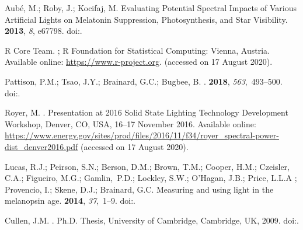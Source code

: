 \documentclass[energies,article,accept,moreauthors,pdftex]{Definitions/mdpi}\usepackage[]{graphicx}\usepackage[]{color}
\begin{document}
\begin{thebibliography}{999}
Aub{\'e}, M.; Roby, J.; Kocifaj, M.
\newblock Evaluating Potential Spectral Impacts of Various Artificial Lights on
  Melatonin Suppression, Photosynthesis, and Star Visibility.
 {\bf 2013}, {\em 8}, e67798.
\newblock
  doi:{\href{https://doi.org/10.1371/journal.pone.0067798}{}}.%









{R Core Team}.
;
\newblock R Foundation for Statistical Computing: Vienna, Austria.  Available online: 
  \url{https://www.r-project.org}.
\newblock (accessed on 17 August 2020).%

Pattison, P.M.; Tsao, J.Y.; Brainard, G.C.; Bugbee, B.
.
 {\bf 2018}, {\em 563},~493--500.
\newblock
  doi:{\href{https://doi.org/10.1038/s41586-018-0706-x}{}}.%

Royer, M.
.
\newblock Presentation at 2016 Solid State Lighting Technology Development
  Workshop,  Denver, CO, USA, 16--17 November 2016.  Available online:  
  \url{https://www.energy.gov/sites/prod/files/2016/11/f34/royer_spectral-power-dist_denver2016.pdf}
\newblock (accessed on 17 August 2020).%

Lucas, R.J.; Peirson, S.N.; Berson, D.M.; Brown, T.M.; Cooper, H.M.; Czeisler,
  C.A.; Figueiro, M.G.; \mbox{Gamlin, P.D.}; Lockley, S.W.; O'Hagan, J.B.; 
  Price, L.L.A ; Provencio, I.; Skene, D.J.; Brainard, G.C.  
\newblock Measuring and using light in the melanopsin age.
 {\bf 2014}, {\em 37},~1--9.
\newblock
  doi:{\href{https://doi.org/10.1016/j.tins.2013.10.004}{}}.%

Cullen, J.M.
.
\newblock Ph.D. Thesis, University of Cambridge, Cambridge, UK,
  2009.
\newblock
  doi:{\href{https://doi.org/10.17863/CAM.13974}{}}.%


\end{thebibliography}
\end{document}
